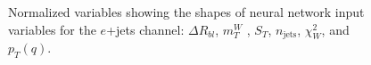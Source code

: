 \begin{figure}[h!]
\vspace{-4.5mm}
\hfil
{}
\caption{Normalized variables showing the shapes of neural network input variables for the $e$+jets channel: $\Delta R_{b l}$, $m_{T}^{W}$ , $S_T$, $n_{\text{jets}}$, $\chi^{2}_{W}$, and $p_T (q)$.}
\label{fig:VarPlotsej2}
\end{figure}


